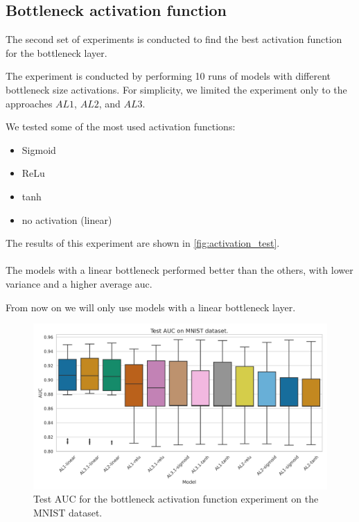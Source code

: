         \subsection{Bottleneck activation function}
            The second set of experiments is conducted to find the best activation function for the bottleneck layer.
            
            The experiment is conducted by performing 10 runs of models with different bottleneck size activations. For simplicity, we limited the experiment only to the approaches $AL1$, $AL2$, and $AL3$.
            
            
            We tested some of the most used activation functions:
            \begin{itemize}
                \item Sigmoid
                \item ReLu
                \item tanh
                \item no activation (linear)
            \end{itemize}
            
            
            \noindent The results of this experiment are shown in \autoref{fig:activation_test}.
            \\
            \\
            The models with a linear bottleneck performed better than the others, with lower variance and a higher average \acrshort{auc}.
            
            From now on we will only use models with a linear bottleneck layer.
            
             \begin{figure}[H]
                \centering
                \centerline{\includegraphics[width=\textwidth]{img/results/test_act.png}}
                \caption{Test AUC for the bottleneck activation function experiment on the MNIST dataset.}
                \label{fig:activation_test}
            \end{figure}
            
